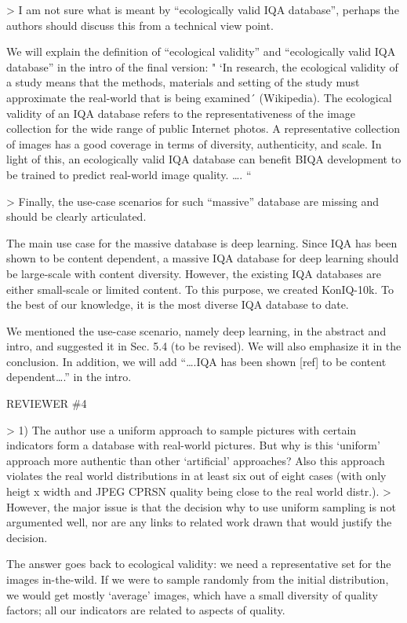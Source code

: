\documentclass{article}
\begin{document}
> I am not sure what is meant by “ecologically valid IQA database”, perhaps the authors should discuss this from a technical view point.

We will explain the definition of “ecological validity” and “ecologically valid IQA database” in the intro of the final version:
" `In research, the ecological validity of a study means that the methods, materials and setting of the study must approximate the real-world that is being examined´ (Wikipedia). The ecological validity of an IQA database refers to the representativeness of the image collection for the wide range of public Internet photos. A representative collection of images has a good coverage in terms of diversity, authenticity, and scale. In light of this, an ecologically valid IQA database can benefit BIQA development to be trained to predict real-world image quality. …. “


> Finally, the use-case scenarios for such “massive” database are missing and should be clearly articulated.

The main use case for the massive database is deep learning. Since IQA has been shown to be content dependent, a massive IQA database for deep learning should be large-scale with content diversity. However, the existing IQA databases are either small-scale or limited content. To this purpose, we created KonIQ-10k. To the best of our knowledge, it is the most diverse IQA database to date.

We mentioned the use-case scenario, namely deep learning, in the abstract and intro, and suggested it in Sec. 5.4 (to be revised). We will also emphasize it in the conclusion. In addition, we will add “….IQA has been shown [ref] to be content dependent….” in the intro. 


REVIEWER \#4

> 1) The author use a uniform approach to sample pictures with certain indicators form a database with real-world pictures. But why is this ‘uniform’ approach more authentic than other ‘artificial’ approaches? Also this approach violates the real world distributions in at least six out of eight cases (with only heigt x width and JPEG CPRSN quality being close to the real world distr.). 
> However, the major issue is that the decision why to use uniform sampling is not argumented well, nor are any links to related work drawn that would justify the decision.

The answer goes back to ecological validity: we need a representative set for the images in-the-wild. If we were to sample randomly from the initial distribution, we would get mostly ‘average’ images, which have a small diversity of quality factors; all our indicators are related to aspects of quality.
\end{document}
